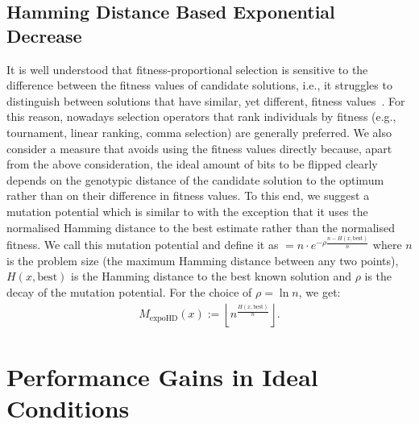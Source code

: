 \documentclass[lettersize,journal]{IEEEtran}
\begin{document}
 \subsection*{Hamming Distance Based Exponential Decrease}
 It is well understood that fitness-proportional selection is sensitive to the difference between the fitness values of candidate solutions, i.e., it struggles to distinguish between solutions that have similar, yet different, fitness values~\cite{OlivetoWittTCS2014,OlivetoWitt2015,Whitley1989,NeumannOlivetoWitt2009}. For this reason, nowadays selection operators that rank individuals by fitness (e.g., tournament, linear ranking, comma selection) are generally preferred. We also consider a measure that  avoids using the fitness values directly because, apart from the above consideration, the ideal amount of bits to be flipped clearly depends on the genotypic distance of the candidate solution to the optimum rather than on their difference in fitness values. To this end, we suggest a mutation potential which is similar to {\expoF } with the exception that it uses the normalised Hamming distance to the best estimate rather than the normalised fitness. We call this mutation potential {\expoHD } and define it as \expoHD$=n \cdot e^{-\rho \frac{n-H(x,\text{best})}{n}}$ where $n$ is the problem size (the maximum Hamming distance between  any two  points), $H(x,\text{best})$ is the Hamming distance to the best known solution and $\rho$ is the decay of the mutation potential. For the choice of $\rho=\ln n$, we get: %
 	\begin{align*}%
 	M_{\text{expoHD}}(x):=\left\lfloor n^{\frac{H(x,\text{best})}{n}} \right\rfloor.
 	\end{align*}
 	
 	
\section{Performance Gains in Ideal Conditions}\label{sec:OptKnown} %








\end{document}

